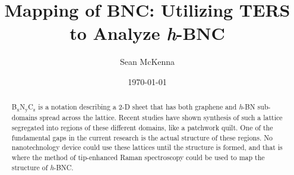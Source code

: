 \documentclass[11pt]{article}
\title{Mapping of B\sub{x}N\sub{y}C\sub{z}: Utilizing TERS to Analyze \textit{h}-BNC}
\author{Sean McKenna}
\date{\today}
\newcommand{\sub}[1]{\ensuremath{_{\textrm{#1}}}}
\begin{document}
\maketitle

\begin{abstract}
B\sub{x}N\sub{y}C\sub{z} is a notation describing a 2-D sheet that has both graphene and \textit{h}-BN sub-domains spread across the lattice. Recent studies have shown synthesis of such a lattice segregated into regions of these different domains, like a patchwork quilt. One of the fundamental gaps in the current research is the actual structure of these regions. No nanotechnology device could use these lattices until the structure is formed, and that is where the method of tip-enhanced Raman spectroscopy could be used to map the structure of \textit{h}-BNC. \\ \\

\end{abstract}
\end{document}
